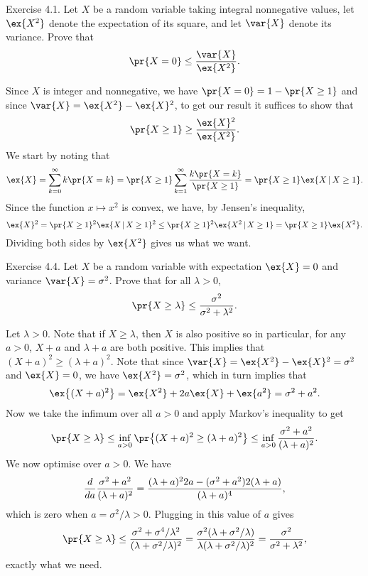 \proclaim Exercise 4.1. Let $X$ be a random variable taking integral nonnegative values, let $\ex\{X^2\}$
denote the expectation of its square, and let $\var\{X\}$ denote its variance. Prove that
$$\pr\{ X = 0\} \le {\var\{X\} \over \ex\{X^2\}}.$$

\proof Since $X$ is integer and nonnegative, we have $\pr\{X = 0\} = 1-\pr\{X\ge 1\}$ and since
$\var\{X\} = \ex\{X^2\} - \ex\{X\}^2$, to get our result it suffices to show that
$$\pr\{X\ge 1\} \ge {\ex\{X\}^2 \over \ex\{X^2\}}.$$
We start by noting that
$$\ex\{X\} = \sum_{k=0}^\infty k \pr\{X=k\}
= \pr\{X\ge 1\}\sum_{k=1}^\infty {k\pr\{X=k\}\over \pr\{X\ge 1\}}
= \pr\{X\ge 1\}\ex\{ X \given X\ge 1\}.$$
Since the function $x\mapsto x^2$ is convex, we have, by Jensen's inequality,
$$\ex\{X\}^2 = \pr\{X\ge 1\}^2 \ex\{X\given X\ge 1\}^2 \le \pr\{X\ge 1\}^2 \ex\{X^2 \given X\ge 1\}
= \pr\{X\ge 1\} \ex\{X^2\}.$$
Dividing both sides by $\ex\{X^2\}$ gives us what we want.\slug

\proclaim Exercise 4.4. Let $X$ be a random variable with expectation $\ex\{X\} =0$ and variance
$\var\{X\} = \sigma^2$. Prove that for all $\lambda > 0$,
$$\pr\{X\ge \lambda\} \le {\sigma^2\over \sigma^2 + \lambda^2}.$$

\proof Let $\lambda > 0$. Note that if $X\ge \lambda$, then $X$ is also positive so in particular,
for any $a>0$, $X+a$ and $\lambda + a$ are both positive. This implies that $(X+a)^2\ge (\lambda+a)^2$.
Note that since $\var\{X\} = \ex\{X^2\} - \ex\{X\}^2 = \sigma^2$ and $\ex\{X\}=0$, we have
$\ex\{X^2\} = \sigma^2$, which in turn implies that
$$\ex\bigl\{(X+a)^2\bigr\} = \ex\{X^2\} + 2a\ex\{X\} + \ex\{a^2\} = \sigma^2+a^2.$$
Now we take the infimum over all $a>0$ and apply Markov's inequality to get
$$\pr\{X\ge\lambda\} \le \inf_{a > 0} \pr\bigl\{(X+a)^2 \ge (\lambda+a)^2\bigr\} \le
\inf_{a>0} {\sigma^2 + a^2\over (\lambda + a)^2}.$$
We now optimise over $a>0$. We have
$${d\over da} {\sigma^2 + a^2\over (\lambda + a)^2}
  = {(\lambda+a)^2 2a - (\sigma^2+a^2)2(\lambda+a)\over (\lambda + a)^4},$$
which is zero when $a = \sigma^2/\lambda > 0$. Plugging in this value of $a$ gives
$$\pr\{X\ge \lambda\} \le {\sigma^2 + \sigma^4/\lambda^2\over (\lambda + \sigma^2/\lambda)^2}
= {\sigma^2(\lambda + \sigma^2/\lambda) \over \lambda(\lambda + \sigma^2/\lambda)^2}
= {\sigma^2 \over \sigma^2+\lambda^2},$$
exactly what we need.\slug

\bye
